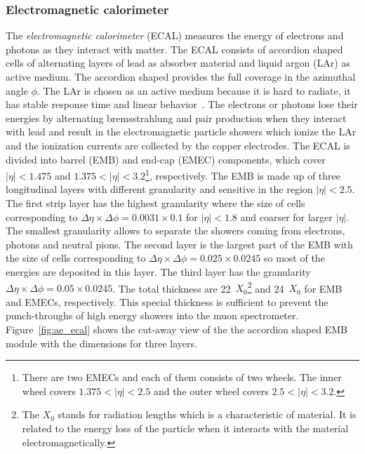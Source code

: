 
\subsubsection{Electromagnetic calorimeter}
\label{subsubsec:ae_ecal}
The \textit{electromagnetic calorimeter} (ECAL) measures the energy of electrons and photons as they interact with matter.
The ECAL consists of accordion shaped cells of alternating layers of lead as absorber material and liquid argon (LAr) as active medium.
The accordion shaped provides the full coverage in the azimuthal angle $\phi$.
The LAr is chosen as an active medium because it is hard to radiate, it has stable response time and linear behavior~\cite{Aad:2008zzm}.
The electrons or photons lose their energies by alternating bremsstrahlung and pair production when they interact with lead and result in the electromagnetic particle showers which ionize the LAr and the ionization currents are collected by the copper electrodes.
The ECAL is divided into barrel (EMB) and end-cap (EMEC) components, which cover $|\eta| < 1.475$ and $1.375 < |\eta| < 3.2$\footnote{There are two EMECs and each of them consists of two wheels. The inner wheel covers $1.375 < |\eta| < 2.5$ and the outer wheel covers $2.5 < |\eta| < 3.2$.}, respectively.
The EMB is made up of three longitudinal layers with different granularity and sensitive in the region $|\eta| < 2.5$.
The first strip layer has the highest granularity where the size of cells corresponding to $\Delta \eta \times \Delta \phi = 0.0031 \times 0.1$ for $|\eta| < 1.8$ and coarser for larger $|\eta|$.
The smallest granularity allows to separate the showers coming from electrons, photons and neutral pions.
The second layer is the largest part of the EMB with the size of cells corresponding to $\Delta \eta \times \Delta \phi = 0.025 \times 0.0245$ so most of the energies are deposited in this layer.
The third layer has the granularity $\Delta \eta \times \Delta \phi = 0.05 \times 0.0245$.
The total thickness are 22~$X_{0}$\footnote{The $X_{0}$ stands for radiation lengths which is a characteristic of material. It is related to the energy loss of the particle when it interacts with the material electromagnetically.} and 24~$X_{0}$ for EMB and EMECs, respectively.
This special thickness is sufficient to prevent the punch-throughs of high energy showers into the muon spectrometer.
Figure~\ref{fig:ae_ecal} shows the cut-away view of the the accordion shaped EMB module with the dimensions for three layers.

